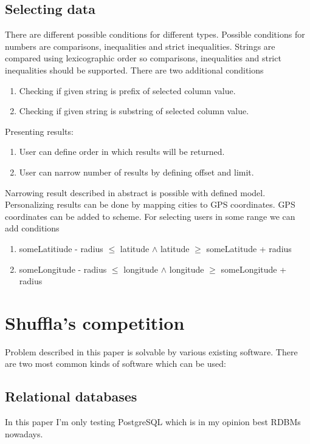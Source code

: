 \documentclass[10pt,a4paper]{article}
\begin{document}
\subsection{Selecting data}
There are different possible conditions for different types. Possible conditions for numbers are comparisons, inequalities and strict inequalities. Strings are compared using lexicographic order so comparisons, inequalities and strict inequalities should be supported. There are two additional conditions
\begin{enumerate}
\item Checking if given string is prefix of selected column value. 
\item Checking if given string is substring of selected column value. 
\end{enumerate}
Presenting results:
\begin{enumerate}
\item User can define order in which results will be returned.
\item User can narrow number of results by defining offset and limit.
\end{enumerate}

Narrowing result described in abstract is possible with defined model. Personalizing results can be done by mapping cities to GPS coordinates. GPS coordinates can be added to scheme. For selecting users in some range we can add conditions   
\begin{enumerate}
\item{someLatitiude - radius $\leq$ latitude $\wedge$ latitude $\geq$ someLatitude + radius}
\item{someLongitude - radius $\leq$ longitude $\wedge$ longitude $\geq$ someLongitude + radius}
\end{enumerate}

\section{Shuffla's competition}
Problem described in this paper is solvable by various existing software. There are two most common kinds of software which can be used:

\subsection{Relational databases}
In this paper I'm only testing PostgreSQL which is in my opinion best RDBMs nowadays.
\end{document}
